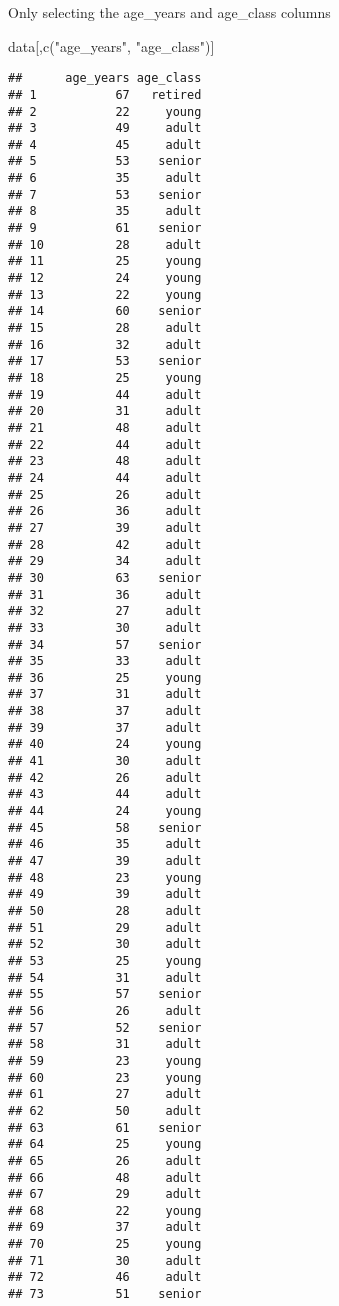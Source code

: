 \documentclass[
]{article}
\newenvironment{Shaded}{\begin{snugshade}}{\end{snugshade}}
\newcommand{\FunctionTok}[1]{\textcolor[rgb]{0.00,0.00,0.00}{#1}}
\newcommand{\NormalTok}[1]{#1}
\newcommand{\StringTok}[1]{\textcolor[rgb]{0.31,0.60,0.02}{#1}}
\begin{document}
Only selecting the age\_years and age\_class columns

\begin{Shaded}
\begin{Highlighting}[]
\NormalTok{data[,}\FunctionTok{c}\NormalTok{(}\StringTok{"age\_years"}\NormalTok{, }\StringTok{"age\_class"}\NormalTok{)]}
\end{Highlighting}
\end{Shaded}

\begin{verbatim}
##      age_years age_class
## 1           67   retired
## 2           22     young
## 3           49     adult
## 4           45     adult
## 5           53    senior
## 6           35     adult
## 7           53    senior
## 8           35     adult
## 9           61    senior
## 10          28     adult
## 11          25     young
## 12          24     young
## 13          22     young
## 14          60    senior
## 15          28     adult
## 16          32     adult
## 17          53    senior
## 18          25     young
## 19          44     adult
## 20          31     adult
## 21          48     adult
## 22          44     adult
## 23          48     adult
## 24          44     adult
## 25          26     adult
## 26          36     adult
## 27          39     adult
## 28          42     adult
## 29          34     adult
## 30          63    senior
## 31          36     adult
## 32          27     adult
## 33          30     adult
## 34          57    senior
## 35          33     adult
## 36          25     young
## 37          31     adult
## 38          37     adult
## 39          37     adult
## 40          24     young
## 41          30     adult
## 42          26     adult
## 43          44     adult
## 44          24     young
## 45          58    senior
## 46          35     adult
## 47          39     adult
## 48          23     young
## 49          39     adult
## 50          28     adult
## 51          29     adult
## 52          30     adult
## 53          25     young
## 54          31     adult
## 55          57    senior
## 56          26     adult
## 57          52    senior
## 58          31     adult
## 59          23     young
## 60          23     young
## 61          27     adult
## 62          50     adult
## 63          61    senior
## 64          25     young
## 65          26     adult
## 66          48     adult
## 67          29     adult
## 68          22     young
## 69          37     adult
## 70          25     young
## 71          30     adult
## 72          46     adult
## 73          51    senior

\end{verbatim}
\end{document}
